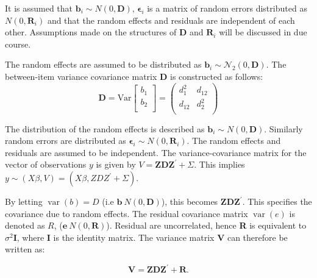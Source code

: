 \documentclass[12pt, a4paper]{report}
\theoremstyle{plain}
\theoremstyle{definition}
\theoremstyle{remark}
\begin{document}
It is assumed that $\boldsymbol{b}_i \sim N(0,\boldsymbol{D})$, $\boldsymbol{\epsilon}_i$ is a matrix of random errors distributed as $N(0,\boldsymbol{R}_i)$ and that the random effects and residuals are independent of each other. Assumptions made on the structures of $\boldsymbol{D}$ and $\boldsymbol{R}_i$ will be discussed in due course.

The random effects are assumed to be distributed as $\boldsymbol{b}_i \sim \mathcal{N}_2(0,\boldsymbol{D})$. The between-item variance covariance matrix $\boldsymbol{D}$ is constructed as follows:
\[ \boldsymbol{D} = \mbox{Var}  \left[
\begin{array}{c}
b_1   \\
b_2  \\
\end{array}
\right] =  \left(
\begin{array}{cc}
d^2_1  & d_{12} \\
d_{12} & d^2_2 \\
\end{array}
\right) \]



The distribution of the random effects is described as $\boldsymbol{b}_i \sim N(0,\boldsymbol{D})$. Similarly random errors are distributed as $\boldsymbol{\epsilon}_i \sim N(0,\boldsymbol{R}_i)$. The random effects and residuals are assumed to be independent. The variance-covariance matrix for the vector of observations $y$ is given by $V = \boldsymbol{ZDZ}^{\prime}+ \Sigma.$ This implies $y \sim(X\beta, V) = (X\beta,ZDZ^{\prime}+ \Sigma)$. 


By letting $\operatorname{var}(b) = D$ (i.e $\textbf{b} ~ N(0,\textbf{D})$), this becomes $\boldsymbol{ZDZ}^{\prime}$. This specifies the covariance due to random
effects. The residual covariance matrix $\operatorname{var}(e)$ is denoted as $R$, ($\textbf{e} ~ N(0,\textbf{R})$). Residual are uncorrelated,
hence \textbf{R} is equivalent to $\sigma^{2}$\textbf{I}, where \textbf{I} is the identity matrix. The variance matrix \textbf{V}
can therefore be written as:

\begin{equation}
\textbf{V}  = \textbf{ZDZ}^{\prime} + \textbf{R}.
\end{equation}
\end{document}
